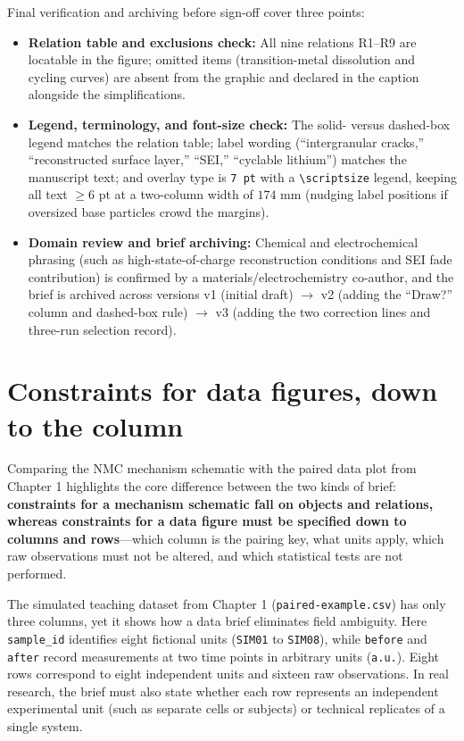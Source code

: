 Final verification and archiving before sign-off cover three points:
\begin{itemize}
\item \textbf{Relation table and exclusions check:} All nine relations R1--R9 are locatable in the figure; omitted items (transition-metal dissolution and cycling curves) are absent from the graphic and declared in the caption alongside the simplifications.
\item \textbf{Legend, terminology, and font-size check:} The solid- versus dashed-box legend matches the relation table; label wording (``intergranular cracks,'' ``reconstructed surface layer,'' ``SEI,'' ``cyclable lithium'') matches the manuscript text; and overlay type is \texttt{7 pt} with a \texttt{\textbackslash scriptsize} legend, keeping all text $\ge 6\text{ pt}$ at a two-column width of $174\text{ mm}$ (nudging label positions if oversized base particles crowd the margins).
\item \textbf{Domain review and brief archiving:} Chemical and electrochemical phrasing (such as high-state-of-charge reconstruction conditions and SEI fade contribution) is confirmed by a materials/electrochemistry co-author, and the brief is archived across versions v1 (initial draft) \ensuremath{\rightarrow} v2 (adding the ``Draw?'' column and dashed-box rule) \ensuremath{\rightarrow} v3 (adding the two correction lines and three-run selection record).
\end{itemize}

\section{Constraints for data figures, down to the column}

Comparing the NMC mechanism schematic with the paired data plot from Chapter 1 highlights the core difference between the two kinds of brief: \textbf{constraints for a mechanism schematic fall on objects and relations, whereas constraints for a data figure must be specified down to columns and rows}---which column is the pairing key, what units apply, which raw observations must not be altered, and which statistical tests are not performed.

The simulated teaching dataset from Chapter 1 (\texttt{paired-example.csv}) has only three columns, yet it shows how a data brief eliminates field ambiguity. Here \texttt{sample\_id} identifies eight fictional units (\texttt{SIM01} to \texttt{SIM08}), while \texttt{before} and \texttt{after} record measurements at two time points in arbitrary units (\texttt{a.u.}). Eight rows correspond to eight independent units and sixteen raw observations. In real research, the brief must also state whether each row represents an independent experimental unit (such as separate cells or subjects) or technical replicates of a single system.

